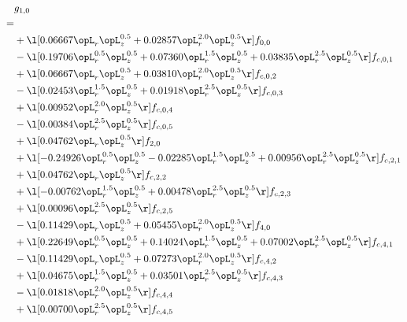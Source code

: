 \begin{alignat}{2} 
\label{eq:g_10_0} 
& g_{1,0} \nonumber \\ 
 = \\ 
& + \l[  0.06667 \opL_r \opL_z^{0.5} +  0.02857 \opL_r^{2.0} \opL_z^{0.5}  \r] f_{0,0} \nonumber \\ 
& - \l[  0.19706 \opL_r^{0.5} \opL_z^{0.5} +  0.07360 \opL_r^{1.5} \opL_z^{0.5} +  0.03835 \opL_r^{2.5} \opL_z^{0.5}  \r] f_{c,0,1} \nonumber \\ 
& + \l[  0.06667 \opL_r \opL_z^{0.5} +  0.03810 \opL_r^{2.0} \opL_z^{0.5}  \r] f_{c,0,2} \nonumber \\ 
& - \l[  0.02453 \opL_r^{1.5} \opL_z^{0.5} +  0.01918 \opL_r^{2.5} \opL_z^{0.5}  \r] f_{c,0,3} \nonumber \\ 
& + \l[  0.00952 \opL_r^{2.0} \opL_z^{0.5}  \r] f_{c,0,4} \nonumber \\ 
& - \l[  0.00384 \opL_r^{2.5} \opL_z^{0.5}  \r] f_{c,0,5} \nonumber \\ 
& + \l[  0.04762 \opL_r \opL_z^{0.5}  \r] f_{2,0} \nonumber \\ 
& + \l[  -0.24926 \opL_r^{0.5} \opL_z^{0.5}   -0.02285 \opL_r^{1.5} \opL_z^{0.5} +  0.00956 \opL_r^{2.5} \opL_z^{0.5}  \r] f_{c,2,1} \nonumber \\ 
& + \l[  0.04762 \opL_r \opL_z^{0.5}  \r] f_{c,2,2} \nonumber \\ 
& + \l[  -0.00762 \opL_r^{1.5} \opL_z^{0.5} +  0.00478 \opL_r^{2.5} \opL_z^{0.5}  \r] f_{c,2,3} \nonumber \\ 
& + \l[  0.00096 \opL_r^{2.5} \opL_z^{0.5}  \r] f_{c,2,5} \nonumber \\ 
& - \l[  0.11429 \opL_r \opL_z^{0.5} +  0.05455 \opL_r^{2.0} \opL_z^{0.5}  \r] f_{4,0} \nonumber \\ 
& + \l[  0.22649 \opL_r^{0.5} \opL_z^{0.5} +  0.14024 \opL_r^{1.5} \opL_z^{0.5} +  0.07002 \opL_r^{2.5} \opL_z^{0.5}  \r] f_{c,4,1} \nonumber \\ 
& - \l[  0.11429 \opL_r \opL_z^{0.5} +  0.07273 \opL_r^{2.0} \opL_z^{0.5}  \r] f_{c,4,2} \nonumber \\ 
& + \l[  0.04675 \opL_r^{1.5} \opL_z^{0.5} +  0.03501 \opL_r^{2.5} \opL_z^{0.5}  \r] f_{c,4,3} \nonumber \\ 
& - \l[  0.01818 \opL_r^{2.0} \opL_z^{0.5}  \r] f_{c,4,4} \nonumber \\ 
& + \l[  0.00700 \opL_r^{2.5} \opL_z^{0.5}  \r] f_{c,4,5} \nonumber \\ 
\end{alignat} 


